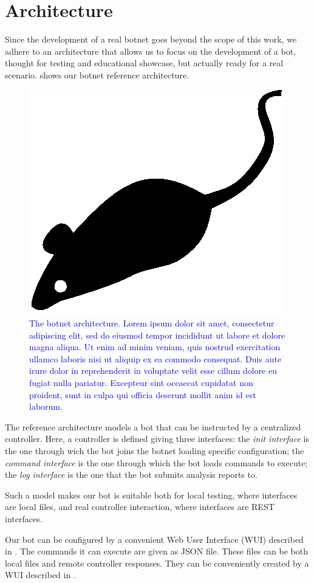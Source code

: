 \section{Architecture}
\label{sec:architecture}

Since the development of a real botnet goes beyond the scope of this work, we adhere to an architecture that allows us to focus on the development of a bot, thought for testing and educational showcase, but actually ready for a real scenario.  shows our botnet reference architecture.

\begin{figure}[tp]
  \centering
  \includegraphics{./fig/acmlarge-mouse}
  \caption{\textcolor{blue}{The botnet architecture. Lorem ipsum dolor sit amet, consectetur adipiscing elit, sed do eiusmod tempor incididunt ut labore et dolore magna aliqua. Ut enim ad minim veniam, quis nostrud exercitation ullamco laboris nisi ut aliquip ex ea commodo consequat. Duis aute irure dolor in reprehenderit in voluptate velit esse cillum dolore eu fugiat nulla pariatur. Excepteur sint occaecat cupidatat non proident, sunt in culpa qui officia deserunt mollit anim id est laborum.}}
    \label{fig:botnet-architecture}
\end{figure}

The reference architecture models a bot that can be instructed by a centralized controller.
Here, a controller is defined giving three interfaces: the \textit{init interface} is the one through wich the bot joins the botnet loading specific configuration; the \textit{command interface} is the one through which the bot loads commands to execute; the \textit{log interface} is the one that the bot submits analysis reports to.

Such a model makes our bot is suitable both for local testing, where interfaces are local files, and real controller interaction, where interfaces are REST interfaces.

Our bot can be configured by a convenient Web User Interface (WUI) described in . The commands it can execute are given as JSON file. These files can be both local files and remote controller responses. They can be conveniently created by a WUI described in .
